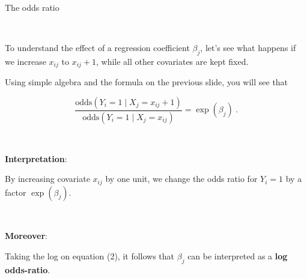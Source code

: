 \documentclass[10pt,ignorenonframetext,]{beamer}
\begin{document}
\begin{frame}

\begin{block}{The odds ratio}

\(~\)

To understand the effect of a regression coefficient \(\beta_j\), let's
see what happens if we increase \(x_{ij}\) to \(x_{ij}+1\), while all
other covariates are kept fixed.

\vspace{2mm} Using simple algebra and the formula on the previous slide,
you will see that

\begin{equation}
\frac{\text{odds}(Y_i=1 \mid X_{j} = x_{ij} + 1)}{\text{odds}(Y_i=1 \mid X_j = x_{ij})} = \exp(\beta_j)  \ .
\end{equation}

\vspace{2mm}

\(~\)

\textbf{Interpretation}:

By increasing covariate \(x_{ij}\) by one unit, we change the odds ratio
for \(Y_i=1\) by a factor \(\exp(\beta_j)\).

\(~\)

\textbf{Moreover}:

Taking the log on equation (2), it follows that \(\beta_j\) can be
interpreted as a \textbf{log odds-ratio}.

\end{block}

\end{frame}
\end{document}
